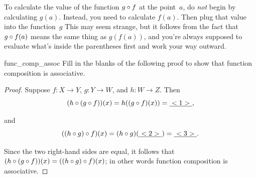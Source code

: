 \begin{warn} \label{ComposeWarn}
To calculate the value of the function $g \circ f$ at the point~$a$, do \emph{not} begin by calculating $g(a)$. Instead, you need to calculate $f(a)$. Then plug that value into the function~$g$ This may seem strange, but it follows from the fact that $g \circ f(a)$ means the same thing as $g ( f(a))$, and you're always supposed to evaluate what's inside the parentheses first and work your way outward.
\end{warn}

\begin{exercise}{func_comp_assoc}
Fill in the blanks of the following proof to show that function composition is associative.

\begin{proof}
Suppose $f: X \to Y$, $g: Y \to W$, and $h: W \to Z$. 
Then 
\[
(h \circ (g \circ f))(x) = h((g \circ f)(x)) =\underline{~<1>~},\]

\noindent
and
\[ ((h \circ g) \circ f)(x) = (h \circ g)(\underline{~<2>~}) =  \underline{~<3>~}. \]

\noindent
Since the two right-hand sides are equal, it follows that $(h \circ (g \circ f))(x) = ((h \circ g) \circ f)(x)$; in other words function composition is associative.
\end{proof}
\end{exercise}

